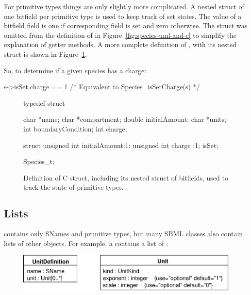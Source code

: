 \documentclass{sbmlmanual}
\begin{document}
For primitive types things are only slightly more complicated.  A
nested  struct of one bitfield per primitive type is
used to keep track of set states.  The value of a bitfield field is
one if corresponding field is set and zero otherwise.  The
 struct was omitted from the definition of
 in Figure~\ref{fig:species-uml-and-c} to simplify
the explanation of getter methods.  A more complete definition of
, with its  nested struct is shown
in Figure~\ref{fig:species-isSet}.


So, to determine if a given species  has a charge:

\begin{example}[c]
  s->isSet.charge == 1  /* Equivalent to Species_isSetCharge(s) */
\end{example}


\begin{figure}[bth]
  \begin{codeVerbatim}[C,flexiblecolumns=false]
typedef struct
{
  char    *name;
  char    *compartment;
  double  initialAmount;
  char    *units;
  int     boundaryCondition;
  int     charge;

  struct
  {
    unsigned int initialAmount:1;
    unsigned int charge       :1;
  } isSet;

} Species_t;
  \end{codeVerbatim}
  \caption{Definition of  C struct, including its
  nested  struct of bitfields, used to track the state
  of primitive types.}
  \label{fig:species-isSet}
\end{figure}


\subsection{Lists}
\label{sec:lists}

 contains only SNames and primitive types, but many
SBML classes also contain lists of other objects.  For example, a
 contains a list of :


\begin{figure}[h]
  \centering
  \includegraphics[scale=0.68]{unitdefinition}
  \label{fig:unit-definition}
\end{figure}
\end{document}
